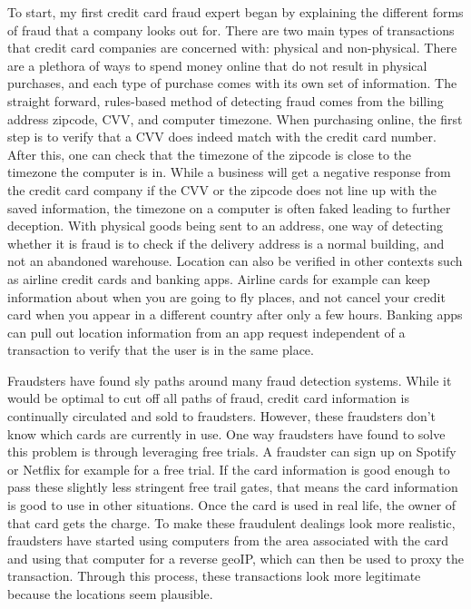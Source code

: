 \documentclass[midd]{thesis}
\begin{document}
To start, my first credit card fraud expert began by explaining the different forms of fraud that a company looks out for. There are two main types of transactions that credit card companies are concerned with: physical and non-physical. There are a plethora of ways to spend money online that do not result in physical purchases, and each type of purchase comes with its own set of information. The straight forward, rules-based method of detecting fraud comes from the billing address zipcode, CVV, and computer timezone. When purchasing online, the first step is to verify that a CVV does indeed match with the credit card number. After this, one can check that the timezone of the zipcode is close to the timezone the computer is in. While a business will get a negative response from the credit card company if the CVV or the zipcode does not line up with the saved information, the timezone on a computer is often faked leading to further deception. With physical goods being sent to an address, one way of detecting whether it is fraud is to check if the delivery address is a normal building, and not an abandoned warehouse. Location can also be verified in other contexts such as airline credit cards and banking apps. Airline cards for example can keep information about when you are going to fly places, and not cancel your credit card when you appear in a different country after only a few hours. Banking apps can pull out location information from an app request independent of a transaction to verify that the user is in the same place.

Fraudsters have found sly paths around many fraud detection systems. While it would be optimal to cut off all paths of fraud, credit card information is continually circulated and sold to fraudsters. However, these fraudsters don't know which cards are currently in use. One way fraudsters have found to solve this problem is through leveraging free trials. A fraudster can sign up on Spotify or Netflix for example for a free trial. If the card information is good enough to pass these slightly less stringent free trail gates, that means the card information is good to use in other situations. Once the card is used in real life, the owner of that card gets the charge. To make these fraudulent dealings look more realistic, fraudsters have started using computers from the area associated with the card and using that computer for a reverse geoIP, which can then be used to proxy the transaction. Through this process, these transactions look more legitimate because the locations seem plausible. 
\end{document}
